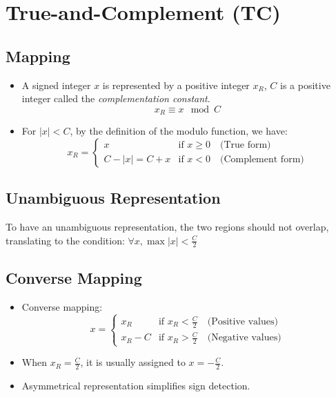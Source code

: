 \documentclass[12pt,openany, tikz,border=10pt]{book}
\begin{document}
	\section{True-and-Complement (TC)}
	
	\subsection{Mapping}
	\begin{itemize}
		\item[] A signed integer \( x \) is represented by a positive integer \( x_R \), \( C \) is a positive integer called the \textit{complementation constant}.
		      \[ x_R \equiv x \mod C \]
		          
		\item[] For \( |x| < C \), by the definition of the modulo function, we have:
		      \[
		      	x_R = 
		      	\begin{cases} 
		      		x               & \text{if } x \geq 0 \quad \text{(True form)}    \\
		      		C - |x| = C + x & \text{if } x < 0 \quad \text{(Complement form)} 
		      	\end{cases}
		      \]
	\end{itemize}
	
	\subsection{Unambiguous Representation}
	To have an unambiguous representation, the two regions should not overlap, translating to the condition:
		$\forall x, \max |x| < \frac{C}{2} $

	
	
	\subsection{Converse Mapping}
	\begin{itemize}
		\item[] Converse mapping:
		      \[
		      	x = 
		      	\begin{cases} 
		      		x_R     & \text{if } x_R < \frac{C}{2} \quad \text{(Positive values)} \\
		      		x_R - C & \text{if } x_R > \frac{C}{2} \quad \text{(Negative values)} 
		      	\end{cases}
		      \]
		\item[] When \( x_R = \frac{C}{2} \), it is usually assigned to \( x = -\frac{C}{2} \).
		\item[] Asymmetrical representation simplifies sign detection.
		      
	\end{itemize}
	
\end{document}
